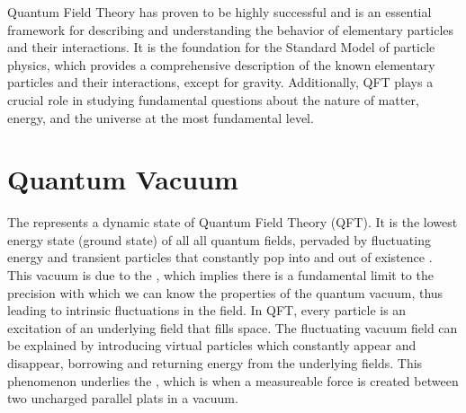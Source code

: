 Quantum Field Theory has proven to be highly successful and is an essential framework for describing and understanding the behavior of elementary particles and their interactions. It is the foundation for the Standard Model of particle physics, which provides a comprehensive description of the known elementary particles and their interactions, except for gravity. Additionally, QFT plays a crucial role in studying fundamental questions about the nature of matter, energy, and the universe at the most fundamental level.

\section{Quantum Vacuum}

The  represents a dynamic state of Quantum Field Theory (QFT). It is the lowest energy state (ground state) of all all quantum fields, pervaded by fluctuating energy and transient particles that constantly pop into and out of existence \cite{bib:Being, Nothingness, and the Quantum Vacuum}. This vacuum is due to the , which implies there is a fundamental limit to the precision with which we can know the properties of the quantum vacuum, thus leading to intrinsic fluctuations in the field. In QFT, every particle is an excitation of an underlying field that fills space. The fluctuating vacuum field can be explained by introducing virtual particles which constantly appear and disappear, borrowing and returning energy from the underlying fields. This phenomenon underlies the , which is when a measureable force is created between two uncharged parallel plats in a vacuum.

